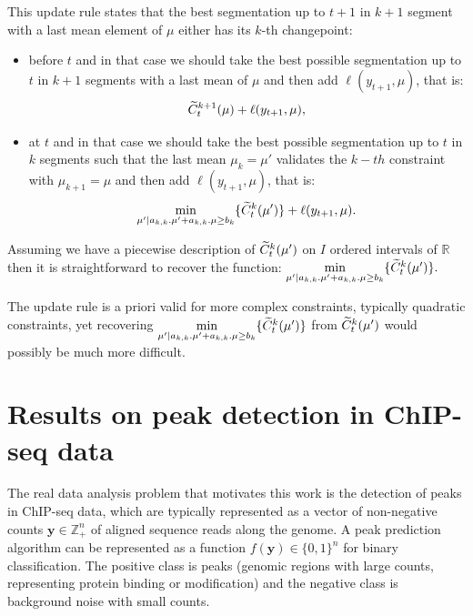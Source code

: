 \documentclass{article}
\newcommand{\ZZ}{\mathbb Z}
\begin{document}
This update rule states that the best segmentation up to $t+1$ in $k+1$ segment with a last mean element of $\mu$ either has its $k$-th changepoint:
\begin{itemize}
\item before $t$ and in that case we should take the best possible segmentation up to $t$ in $k+1$
segments with a last mean of $\mu$ and then add  $\ell(y_{t+1}, \mu)$, that is:
$$\widetilde{C}^{k+1}_{t}(\mu) + \ell(y_{t+1}, \mu),$$

\item at $t$ and in that case we should take the best possible segmentation up to $t$ in $k$ segments
such that the last mean $\mu_k=\mu'$ validates the $k-th$ constraint with $\mu_{k+1}=\mu$ and then add  $\ell(y_{t+1}, \mu)$, that is:
 $$\underset{\mu' | a_{k,k}. \mu' + a_{k,k}. \mu  \geq  b_{k}}{\min} \{ \widetilde{C}^{k}_{t}(\mu') \} + \ell(y_{t+1}, \mu).$$
\end{itemize}


Assuming we have a piecewise description of $\widetilde{C}^{k}_{t}(\mu')$ on $I$ ordered intervals of $\mathbb{R}$
then it is straightforward to recover the function:
$\underset{\mu' | a_{k,k}. \mu' + a_{k,k}. \mu  \geq  b_{k}}{\min} \{ \widetilde{C}^{k}_{t}(\mu') \}.$

The update rule is a priori valid for more complex constraints, typically quadratic constraints, yet recovering
$\underset{\mu' | a_{k,k}. \mu' + a_{k,k}. \mu  \geq  b_{k}}{\min} \{ \widetilde{C}^{k}_{t}(\mu') \}$ from $\widetilde{C}^{k}_{t}(\mu')$ would possibly be much more difficult.


\section{Results on peak detection in ChIP-seq data}

The real data analysis problem that motivates this work is the
detection of peaks in ChIP-seq data, which are typically represented
as a vector of non-negative counts $\mathbf y\in\ZZ_+^n$ of aligned
sequence reads along the genome. A peak prediction algorithm can be
represented as a function $f(\mathbf y)\in\{0,1\}^n$ for binary
classification. The positive class is peaks (genomic regions with
large counts, representing protein binding or modification) and the
negative class is background noise with small counts.
\end{document}
